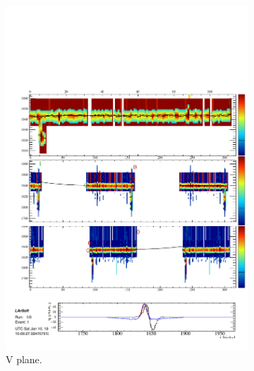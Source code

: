 \begin{figure}
\begin{subfigure}[t]{0.3\linewidth}
    \includegraphics[width=\textwidth]{HitFindingV.pdf}
    \caption{V plane.}
    \label{fig:HitFindingV}
  \end{subfigure}
  \hfill
  \begin{subfigure}[t]{0.3\linewidth}
    \centering

\end{subfigure}
\end{figure}
